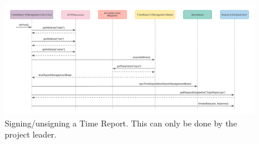 \documentclass{article}
\begin{document}
\begin{figure}[H]
    \centering
    \includegraphics[scale=0.5]{images/signUnsignReports.png}
    \caption{Signing/unsigning a Time Report. This can only be done by the project leader.}
    \label{fig:signunsign}
\end{figure}

\subsection{}

\end{document}
